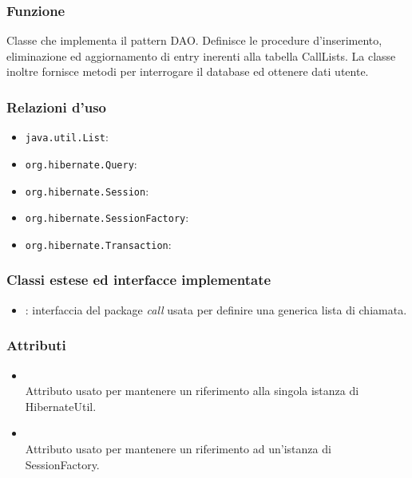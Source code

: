 

\subsubsection*{Funzione}
Classe che implementa il pattern DAO. Definisce le procedure d’inserimento, eliminazione ed aggiornamento di entry inerenti alla tabella CallLists. La classe inoltre fornisce metodi per interrogare il database ed ottenere dati utente.

\subsubsection*{Relazioni d'uso}

\begin{itemize}
	\item \texttt{java.util.List}:
	\item \texttt{org.hibernate.Query}:
	\item \texttt{org.hibernate.Session}:
	\item \texttt{org.hibernate.SessionFactory}:
	\item \texttt{org.hibernate.Transaction}:
\end{itemize}

\subsubsection*{Classi estese ed interfacce implementate}
\begin{itemize}
	\item {}: interfaccia del package \textit{call} usata per definire una generica lista di chiamata.
\end{itemize}

\subsubsection*{Attributi}

\begin{itemize}
	\item{}\\
	Attributo usato per mantenere un riferimento alla singola istanza di HibernateUtil.
	\item{}\\
	Attributo usato per mantenere un riferimento ad un'istanza di SessionFactory.
\end{itemize}

